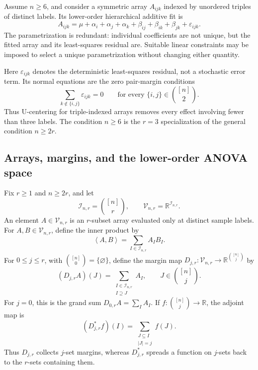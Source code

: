 \documentclass[11pt]{article}
\theoremstyle{plain}
\theoremstyle{definition}
\theoremstyle{remark}
\newcommand{\R}{\mathbb R}
\newcommand{\cI}{\mathcal I}
\newcommand{\cV}{\mathcal V}
\newcommand{\inner}[2]{\left\langle #1,#2\right\rangle}
\begin{document}
Assume $n\ge6$, and consider a symmetric array $A_{ijk}$ indexed by unordered
triples of distinct labels.  Its lower-order hierarchical additive fit is
\[
 A_{ijk}=\mu+\alpha_i+\alpha_j+\alpha_k
 +\beta_{ij}+\beta_{ik}+\beta_{jk}+\varepsilon_{ijk}.
\]
The parametrization is redundant: individual coefficients are not unique,
but the fitted array and its least-squares residual are.  Suitable linear
constraints may be imposed to select a unique parametrization without
changing either quantity.

Here $\varepsilon_{ijk}$ denotes the deterministic least-squares residual,
not a stochastic error term.  Its normal equations are the zero pair-margin
conditions
\[
 \sum_{k\notin\{i,j\}}\varepsilon_{ijk}=0
 \qquad\text{for every }\{i,j\}\in\binom{[n]}2.
\]
Thus U-centering for triple-indexed arrays removes every effect involving fewer
than three labels.  The condition $n\ge6$ is the $r=3$ specialization of the
general condition $n\ge2r$.

\subsection{Arrays, margins, and the lower-order ANOVA space}

Fix $r\ge1$ and $n\ge2r$, and let
\[
 \cI_{n,r}=\binom{[n]}r,
 \qquad
 \cV_{n,r}=\R^{\cI_{n,r}}.
\]
An element $A\in\cV_{n,r}$ is an $r$-subset array evaluated only at
distinct sample labels.  For $A,B\in\cV_{n,r}$, define the inner product by
  \begin{equation*}
 \inner{A}{B}=\sum_{I\in\cI_{n,r}}A_I B_I.
\end{equation*}
For $0\le j\le r$, with $\binom{[n]}0=\{\varnothing\}$, define the margin map
$D_{j,r}:\cV_{n,r}\to\R^{\binom{[n]}{j}}$ by
  \begin{equation*}
 (D_{j,r}A)(J)
 =\sum_{\substack{I\in\cI_{n,r}\\I\supseteq J}}A_I,
 \qquad J\in\binom{[n]}j.
\end{equation*}
For $j=0$, this is the grand sum $D_{0,r}A=\sum_I A_I$.  If
$f:\binom{[n]}j\to\R$, the adjoint map is
  \begin{equation*}
 (D_{j,r}^\ast f)(I)
 =\sum_{\substack{J\subseteq I\\|J|=j}}f(J).
\end{equation*}
Thus $D_{j,r}$ collects $j$-set margins, whereas $D_{j,r}^\ast$ spreads a
function on $j$-sets back to the $r$-sets containing them.
\end{document}

